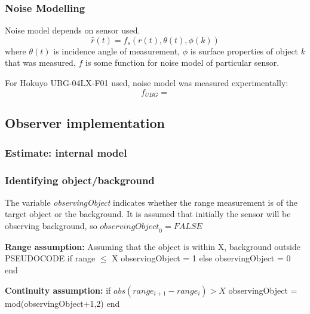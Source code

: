 	\begin{algorithm}[H]
	\SetAlgoLined
	\caption{M{\"o}ller-Trumbore ray-triangle intersection algorithm}
	\end{algorithm}

	\subsubsection{Noise Modelling}
	Noise model depends on sensor used.
	\begin{equation}
		\hat{r}(t) = f_s(r(t),\theta(t),\phi(k))
	\end{equation}
	where $\theta(t)$ is incidence angle of measurement, $\phi$ is surface properties of object $k$ that was measured, $f$ is some function for noise model of particular sensor.
	
	For Hokuyo UBG-04LX-F01 used, noise model was measured experimentally:
	\begin{equation}
		f_{UBG} = 
	\end{equation}
	
\subsection{Observer implementation}
	\subsubsection{Estimate: internal model}
	\subsubsection{Identifying object/background}
		The variable \textit{observingObject} indicates whether the range measurement is of the target object or the background. It is assumed that initially the sensor will be observing background, so $\textit{observingObject}_0 = FALSE$

		\textbf{Range assumption:}
		Assuming that the object is within X, background outside
		PSEUDOCODE
		if range $\leq$ X
			observingObject = 1
		else
			observingObject = 0
		end
		
		\textbf{Continuity assumption:}
		if $abs(range_{i+1}-range_i) > X$
			observingObject = mod(observingObject+1,2)
		end
